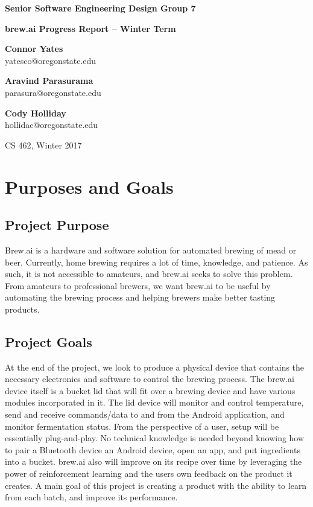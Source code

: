 \documentclass[draftclsnofoot,onecolumn,letterpaper,10pt]{IEEEtran}
\begin{document}
\begin{center}
	{\huge\textbf{Senior Software Engineering Design Group 7}}
	\vspace{1cm}

	{\Huge\textbf{brew.ai Progress Report -- Winter Term}}

	\vspace{2cm}
	\textbf{Connor Yates}\\yatesco@oregonstate.edu

	\textbf{Aravind Parasurama}\\parasura@oregonstate.edu

	\textbf{Cody Holliday}\\hollidac@oregonstate.edu

	\vspace{2cm}
	{\Large CS 462, Winter 2017}
	\vspace{1cm}
\end{center}

\begin{abstract}

\end{abstract}

\newpage
\tableofcontents
\newpage

\section{Purposes and Goals}
\subsection{Project Purpose}
Brew.ai is a hardware and software solution for automated brewing of mead or beer.
Currently, home brewing requires a lot of time, knowledge, and patience. 
As such, it is not accessible to amateurs, and brew.ai seeks to solve this problem. 
From amateurs to professional brewers, we want brew.ai to be useful by automating the brewing process and helping brewers make better tasting products. 

\subsection{Project Goals}
At the end of the project, we look to produce a physical device that contains the necessary electronics and software to control the brewing process.
The brew.ai device itself is a bucket lid that will fit over a brewing device and have various modules incorporated in it. 
The lid device will monitor and control temperature, send and receive commands/data to and from the Android application, and monitor fermentation status.
From the perspective of a user, setup will be essentially plug-and-play. 
No technical knowledge is needed beyond knowing how to pair a Bluetooth device an Android device, open an app, and put ingredients into a bucket.
brew.ai also will improve on its recipe over time by leveraging the power of reinforcement learning and the users own feedback on the product it creates.
A main goal of this project is creating a product with the ability to learn from each batch, and improve its performance.
\end{document}
